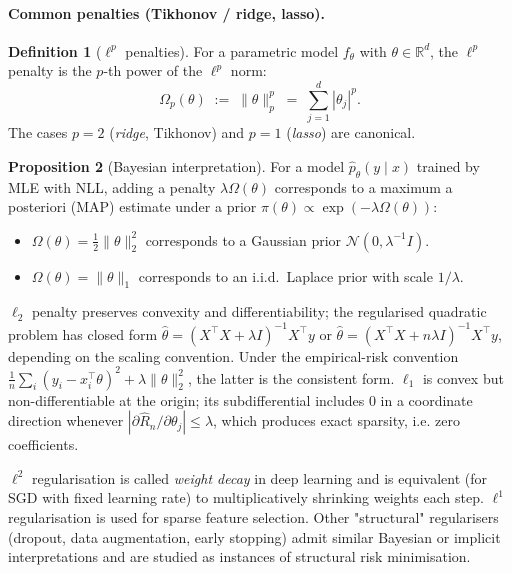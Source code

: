 \documentclass[11pt]{article}
\theoremstyle{definition}
\newtheorem{definition}{Definition}
\newtheorem{proposition}[definition]{Proposition}
\begin{document}
\paragraph{Common penalties (Tikhonov / ridge, lasso).}

\begin{definition}[$\ell^{p}$ penalties]
For a parametric model $f_\theta$ with $\theta \in \mathbb{R}^{d}$, the
$\ell^{p}$ penalty is the $p$-th power of the $\ell^{p}$ norm:
\[
  \Omega_p(\theta) \;:=\; \|\theta\|_{p}^{p}
  \;=\; \sum_{j=1}^{d} |\theta_j|^{p}.
\]
The cases $p = 2$ (\emph{ridge}, Tikhonov) and $p = 1$ (\emph{lasso}) are
canonical.
\end{definition}

\begin{proposition}[Bayesian interpretation]
For a model $\hat p_\theta(y \mid x)$ trained by MLE with NLL, adding a
penalty $\lambda \Omega(\theta)$ corresponds to a maximum a posteriori
(MAP) estimate under a prior $\pi(\theta) \propto \exp(-\lambda \Omega(\theta))$:
\begin{itemize}[leftmargin=2em]
  \item $\Omega(\theta) = \tfrac{1}{2}\|\theta\|_2^{2}$ corresponds to a
        Gaussian prior $\mathcal{N}(0, \lambda^{-1} I)$.
  \item $\Omega(\theta) = \|\theta\|_1$ corresponds to an i.i.d.\ Laplace
        prior with scale $1/\lambda$.
\end{itemize}
\end{proposition}

\begin{mathnote}
$\ell_2$ penalty preserves convexity and differentiability; the regularised quadratic problem
has closed form $\hat{\theta}=(X^\top X+\lambda I)^{-1}X^\top y$ or
$\hat{\theta}=(X^\top X+n\lambda I)^{-1}X^\top y$, depending on the scaling convention.
Under the empirical-risk convention
$\frac1n\sum_i (y_i-x_i^\top\theta)^2+\lambda\|\theta\|_2^2$, the latter is the consistent
form. $\ell_1$ is convex but non-differentiable at the origin; its subdifferential includes
$0$ in a coordinate direction whenever $|\partial \widehat R_n/\partial\theta_j|\le\lambda$,
which produces exact sparsity, i.e. zero coefficients.
\end{mathnote}

\begin{mlnote}
$\ell^2$ regularisation is called \emph{weight decay} in deep learning and
is equivalent (for SGD with fixed learning rate) to multiplicatively
shrinking weights each step. $\ell^1$ regularisation is used for sparse
feature selection. Other "structural" regularisers (dropout, data
augmentation, early stopping) admit similar Bayesian or implicit
interpretations and are studied as instances of structural risk
minimisation.
\end{mlnote}
\end{document}
